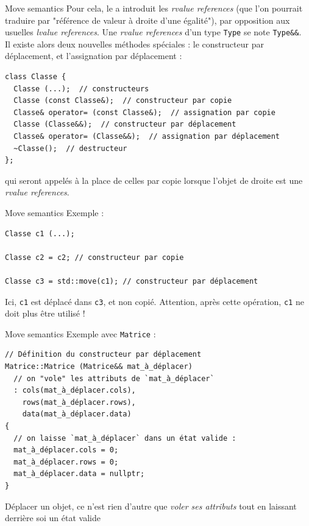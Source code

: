 \documentclass[c]{beamer}
\newcommand{\inline}[1]{\texttt{#1}}
\begin{document}
\begin{frame}[fragile]{Move semantics}
Pour cela, le  a introduit les \textit{rvalue references} (que l'on pourrait traduire par "référence de valeur à droite d'une égalité"), par opposition aux usuelles \textit{lvalue references}. Une \textit{rvalue references} d'un type \inline{Type} se note \inline{Type&&}.\\

Il existe alors deux nouvelles méthodes spéciales : le constructeur par déplacement, et l'assignation par déplacement :
\begin{verbatim}
class Classe {
  Classe (...);  // constructeurs
  Classe (const Classe&);  // constructeur par copie
  Classe& operator= (const Classe&);  // assignation par copie
  Classe (Classe&&);  // constructeur par déplacement
  Classe& operator= (Classe&&);  // assignation par déplacement
  ~Classe();  // destructeur
};
\end{verbatim}
qui seront appelés à la place de celles par copie lorsque l'objet de droite est une \textit{rvalue references}.
\end{frame}

\begin{frame}[fragile]{Move semantics}
Exemple :
\vspace{1em}
\begin{verbatim}
Classe c1 (...);

Classe c2 = c2; // constructeur par copie

Classe c3 = std::move(c1); // constructeur par déplacement
\end{verbatim}
\vspace{1em}
Ici, \inline{c1} est déplacé dans \inline{c3}, et non copié. Attention, après cette opération, \inline{c1} ne doit plus être utilisé !
\end{frame}


\begin{frame}[fragile]{Move semantics}
Exemple avec \inline{Matrice} :
\vspace{1em}
\begin{verbatim}
// Définition du constructeur par déplacement
Matrice::Matrice (Matrice&& mat_à_déplacer)
  // on "vole" les attributs de `mat_à_déplacer`
  : cols(mat_à_déplacer.cols),
    rows(mat_à_déplacer.rows),
    data(mat_à_déplacer.data)
{
  // on laisse `mat_à_déplacer` dans un état valide :
  mat_à_déplacer.cols = 0;
  mat_à_déplacer.rows = 0;
  mat_à_déplacer.data = nullptr;
}
\end{verbatim}
\vspace{1em}
Déplacer un objet, ce n'est rien d'autre que \emph{voler ses attributs} tout en laissant derrière soi un état valide
\end{frame}
\end{document}
